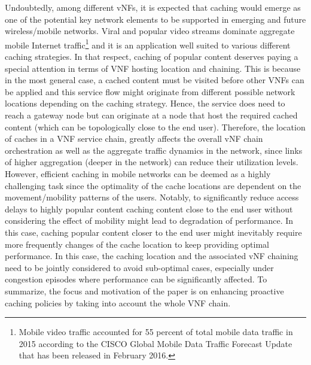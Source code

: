 \documentclass[journal]{IEEEtran}
\begin{document}
Undoubtedly, among different vNFs, it is expected that caching would emerge as one of the potential key network elements to be supported in emerging and future wireless/mobile networks.  Viral and popular video streams dominate aggregate mobile Internet traffic\footnote{Mobile video traffic accounted for 55 percent of total mobile data traffic in 2015 according to  the CISCO Global Mobile Data Traffic Forecast Update that has been released in February 2016.} and it is an application well suited to various different caching strategies. In that respect, caching of popular content deserves paying a special attention in terms of VNF hosting location and chaining. This is because in the most general case, a cached content must be visited before other VNFs can be applied and this service flow might originate from different possible network locations depending on the caching strategy. Hence, the service does need to reach a gateway node but can originate at a node that host the required cached content (which can be topologically close to the end user). Therefore, the location of caches in a VNF service chain, greatly affects the overall vNF chain orchestration as well as the aggregate traffic dynamics in the network, since links of higher aggregation (deeper in the network) can reduce their utilization levels. However, efficient caching in mobile networks can be deemed as a highly challenging task since the optimality of the cache locations are dependent on the movement/mobility patterns of the users. Notably, to significantly reduce access delays to highly popular content caching content close to the end user without considering the effect of mobility might lead to degradation of performance. In this case, caching popular content closer to the end user might inevitably require more frequently changes of the cache location to keep providing optimal performance. In this case, the caching location and the associated vNF chaining need to be jointly considered to avoid sub-optimal cases, especially under congestion episodes where performance can be significantly affected. To summarize, the focus and motivation of the paper is on enhancing proactive caching  policies by taking into account the whole VNF chain.
\end{document}
